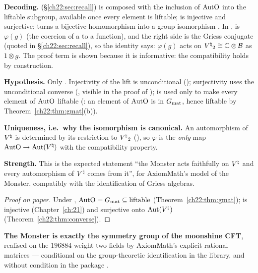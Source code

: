\begin{dictionary}
\textbf{Decoding.}   (\S\ref{ch22:sec:recall}) is  composed with
the inclusion of $\mathrm{AutO}$ into the liftable subgroup, available once every element is liftable;
 is injective and surjective;  turns a bijective homomorphism into a group
isomorphism .  In ,  is $\varphi(g)$ (the
coercion of a  to a function), and the right side is the Griess conjugate (quoted in \S\ref{ch22:sec:recall}),
so the identity says: $\varphi(g)$ acts on ${V^{\natural}}_2\cong{\mathbb{C}}\otimes\mathcal{B}$ as $1\otimes g$.  The proof term
 is shown because it is informative: the compatibility holds by construction.

\textbf{Hypothesis.}  Only .  Injectivity of the lift is unconditional ();
surjectivity uses the unconditional converse (, visible in the
proof of );  is used only to make every element of $\mathrm{AutO}$ liftable
(: an element of $\mathrm{AutO}$ is in $G_{\mathrm{mat}}$, hence liftable by
Theorem~\ref{ch22:thm:gmat}(b)).

\textbf{Uniqueness, i.e.\ why the isomorphism is canonical.}  An automorphism of ${V^{\natural}}$ is determined by its restriction to
${V^{\natural}}_2$ (), so $\varphi$ is the \emph{only} map $\mathrm{AutO}\to\operatorname{Aut}({V^{\natural}})$ with
the compatibility property.

\textbf{Strength.}  This is the expected statement ``the Monster acts faithfully on ${V^{\natural}}$ and every automorphism of ${V^{\natural}}$
comes from it'', for AxiomMath's model of the Monster, compatibly with the identification of Griess algebras.
\end{dictionary}
\begin{proof}[Proof on paper]
Under , $\mathrm{AutO}=G_{\mathrm{mat}}\subseteq\mathrm{liftable}$ (Theorem~\ref{ch22:thm:gmat}); 
is injective (Chapter~\ref{ch:21}) and surjective onto $\operatorname{Aut}({V^{\natural}})$ (Theorem~\ref{ch22:thm:converse}).
\end{proof}
\begin{physics}
\textbf{The Monster is exactly the symmetry group of the moonshine CFT}, realised on the $196884$ weight-two fields by
AxiomMath's explicit rational matrices --- conditional on the group-theoretic identification in the library, and
without condition in the package .
\end{physics}
